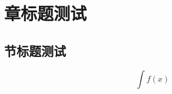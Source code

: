 \documentclass{ctexbook}
\begin{document}
    \chapter{章标题测试}
    \section{节标题测试}
    \begin{equation}
        \int f(x)
    \end{equation}
\end{document}
